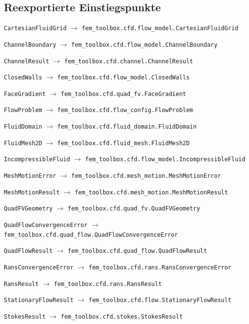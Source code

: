 \subsection*{Reexportierte Einstiegspunkte}
\noindent\nolinkurl{CartesianFluidGrid} $\to$ \nolinkurl{fem_toolbox.cfd.flow_model.CartesianFluidGrid}\par
\noindent\nolinkurl{ChannelBoundary} $\to$ \nolinkurl{fem_toolbox.cfd.flow_model.ChannelBoundary}\par
\noindent\nolinkurl{ChannelResult} $\to$ \nolinkurl{fem_toolbox.cfd.channel.ChannelResult}\par
\noindent\nolinkurl{ClosedWalls} $\to$ \nolinkurl{fem_toolbox.cfd.flow_model.ClosedWalls}\par
\noindent\nolinkurl{FaceGradient} $\to$ \nolinkurl{fem_toolbox.cfd.quad_fv.FaceGradient}\par
\noindent\nolinkurl{FlowProblem} $\to$ \nolinkurl{fem_toolbox.cfd.flow_config.FlowProblem}\par
\noindent\nolinkurl{FluidDomain} $\to$ \nolinkurl{fem_toolbox.cfd.fluid_domain.FluidDomain}\par
\noindent\nolinkurl{FluidMesh2D} $\to$ \nolinkurl{fem_toolbox.cfd.fluid_mesh.FluidMesh2D}\par
\noindent\nolinkurl{IncompressibleFluid} $\to$ \nolinkurl{fem_toolbox.cfd.flow_model.IncompressibleFluid}\par
\noindent\nolinkurl{MeshMotionError} $\to$ \nolinkurl{fem_toolbox.cfd.mesh_motion.MeshMotionError}\par
\noindent\nolinkurl{MeshMotionResult} $\to$ \nolinkurl{fem_toolbox.cfd.mesh_motion.MeshMotionResult}\par
\noindent\nolinkurl{QuadFVGeometry} $\to$ \nolinkurl{fem_toolbox.cfd.quad_fv.QuadFVGeometry}\par
\noindent\nolinkurl{QuadFlowConvergenceError} $\to$ \nolinkurl{fem_toolbox.cfd.quad_flow.QuadFlowConvergenceError}\par
\noindent\nolinkurl{QuadFlowResult} $\to$ \nolinkurl{fem_toolbox.cfd.quad_flow.QuadFlowResult}\par
\noindent\nolinkurl{RansConvergenceError} $\to$ \nolinkurl{fem_toolbox.cfd.rans.RansConvergenceError}\par
\noindent\nolinkurl{RansResult} $\to$ \nolinkurl{fem_toolbox.cfd.rans.RansResult}\par
\noindent\nolinkurl{StationaryFlowResult} $\to$ \nolinkurl{fem_toolbox.cfd.flow.StationaryFlowResult}\par
\noindent\nolinkurl{StokesResult} $\to$ \nolinkurl{fem_toolbox.cfd.stokes.StokesResult}\par
